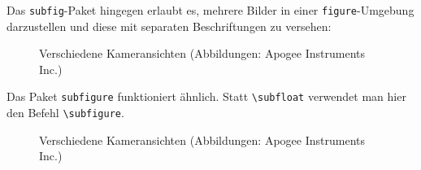 \begin{minipage}\textwidth
Das \verb+subfig+-Paket hingegen erlaubt es, mehrere Bilder in einer \verb+figure+-Umgebung darzustellen und diese mit separaten Beschriftungen zu versehen:
\begin{lcode}
\begin{figure}
  \centering
  \caption{Verschiedene Kameransichten
           (Abbildungen: Apogee Instruments Inc.)}
  \label{fig:cameraviewssubfloat}
\end{figure}
\end{lcode}
Das Paket \verb+subfigure+ funktioniert ähnlich. Statt \verb+\subfloat+ verwendet man hier den Befehl \verb+\subfigure+.

\end{minipage}
\begin{figure}
  \centering
  \caption{Verschiedene Kameransichten
           (Abbildungen: Apogee Instruments Inc.)}
  \label{fig:cameraviewssubfloat}
\end{figure}
